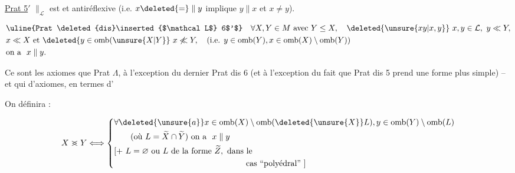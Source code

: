 \uline{Prat  5$'$} $\parallel_{\mathcal L}$ est  et antiréflexive (i.e. $x\deleted{=}\parallel y$ implique $y\parallel x$ et $x\ne y$).

\[
\begin{aligned}
&\text{\uline{Prat \deleted{dis}\inserted{$\mathcal L$} 6$'$}}\quad \forall X,Y\in M\ \text{avec }Y\leq X,\quad \deleted{\unsure{xy|x,y}}\ x,y\in\mathcal L,\ y\ll Y,\\
&x\ll X\ \text{et }\deleted{y\in\mathrm{omb}(\unsure{X|Y}}\ x\not\ll Y,\quad (\text{i.e. } y\in\mathrm{omb}(Y),x\in\mathrm{omb}(X)\setminus\mathrm{omb}(Y))\\
&\text{on a }\ x\parallel y.
\end{aligned}
\]


Ce sont les  axiomes que Prat $\Lambda$, à l'exception du dernier Prat dis 6 (et à l'exception du fait que Prat dis 5 prend une forme plus simple) -- et qui    d'axiomes,   en termes d'


On définira :

\[
X\mathrel{>\mkern-13mu<}Y\Longleftrightarrow
\left\{\begin{aligned}
&\forall\deleted{\unsure{a}}x\in\mathrm{omb}(X)\setminus\mathrm{omb}(\deleted{\unsure{X}}L),y\in\mathrm{omb}(Y)\setminus\mathrm{omb}(L)\\
&\qquad(\text{où }L=\widetilde X\cap\widetilde Y)\ \text{on a }\ x\parallel y\\
&[+\ L=\varnothing\ \text{ou } L\ \text{de la forme }\widetilde Z,\ \text{dans le}\\
&\hspace{16em}\text{cas ``polyédral''}\ ]
\end{aligned}\right.
\]

